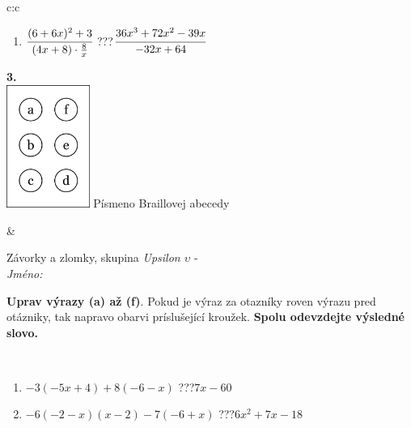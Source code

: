 \documentclass[10pt]{report}
\begin{document}
\begin{tabular}{c:c}
\begin{minipage}[c][104.5mm][t]{0.5\linewidth}
\begin{center}
\begin{minipage}{0.79\linewidth}
\begin{center}
\begin{varwidth}{\linewidth}
\begin{enumerate}
\item $\cfrac{(6+6x)^2+3}{(4x+8)\cdot\frac{8}{x}}$\quad \dotfill\; ???\;\dotfill \quad $\cfrac{36x^3+72x^2-39x}{-32x+64}$
\end{enumerate}
\end{varwidth}
\end{center}
\end{minipage}
\begin{minipage}{0.20\linewidth}
\begin{center}
{\Huge\bfseries 3.} \\[2mm]
\includegraphics[height=40mm]{../images/braille.png}
{\small Písmeno Braillovej abecedy}
\end{center}
\end{minipage}
\end{center}
\end{minipage}
&
\begin{minipage}[c][104.5mm][t]{0.5\linewidth}
\begin{center}
\vspace{7mm}
{\huge Závorky a zlomky, skupina \textit{Upsilon $\upsilon$} -}\\[5mm]
\textit{Jméno:}\phantom{xxxxxxxxxxxxxxxxxxxxxxxxxxxxxxxxxxxxxxxxxxxxxxxxxxxxxxxxxxxxxxxxx}\\[5mm]
\begin{minipage}{0.95\linewidth}
\begin{center}
\textbf{Uprav výrazy (a) až (f)}. Pokud je výraz za otazníky roven výrazu pred otázniky, tak napravo obarvi príslušející kroužek. \textbf{Spolu odevzdejte výsledné slovo.}
\end{center}
\end{minipage}
\\[1mm]
\begin{minipage}{0.79\linewidth}
\begin{center}
\begin{varwidth}{\linewidth}
\begin{enumerate}
\normalsize
\item $-3(-5x+4)+8(-6-x)$\quad \dotfill\; ???\;\dotfill \quad $7x-60$
\item $-6(-2-x)(x-2)-7(-6+x)$\quad \dotfill\; ???\;\dotfill \quad $6x^2+7x-18$

\end{enumerate}
\end{varwidth}
\end{center}
\end{minipage}
\end{center}
\end{minipage}
\end{tabular}
\end{document}
